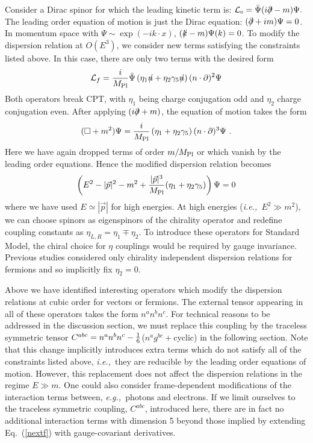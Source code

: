 \documentclass[12pt]{article}
\newcommand{\gam}{\gamma}
\newcommand{\be}{\begin{equation}}
\newcommand{\ee}{\end{equation}}
\newcommand{\ie}{{\it i.e.,}\ }
\newcommand{\eg}{{\it e.g.,}\ }
\newcommand{\cL}{{\mathcal L}}
\newcommand{\ssc}{\scriptscriptstyle}
\newcommand{\LL}[1]{\cL_{\ssc #1}}
\newcommand{\prt}{\partial}
\newcommand{\Psib}{\bar{\Psi}}
\newcommand{\mpl}{M_{\rm {\small Pl}}}
\newcommand{\sla}[1]{\hbox{{$#1$}\llap{$/$}}}
\newcommand{\sixth}{{{\scriptstyle 1}\over{\scriptstyle 6}}}
\begin{document}
 Consider a Dirac spinor for which the
leading kinetic term is: $\LL0 = \Psib(i\sla{\prt}-m)\Psi.$ The
leading order equation of motion is just the Dirac equation:
$(\sla{\prt}+im)\Psi=0$. In momentum space with
$\Psi\sim\exp(-ik\cdot x)$, $(\sla{k}-m)\Psi(k)=0$. To modify the
dispersion relation at $O(E^3)$, we consider new terms satisfying
the constraints listed above. In this case, there are only two
terms with the desired form
%
\be \label{nextf} {\mathcal L}_f={i\over\mpl}\Psib\left(
\eta_1\sla{n}
+\eta_2\gam_5\sla{n}
\right)(n\cdot\prt)^2\Psi \ee
%
Both operators break CPT, with $\eta_1$ being charge conjugation
odd and $\eta_2$ charge conjugation even. After applying
$(i\sla{\prt}+m)$, the equation of motion takes the form
%
\be\label{neweomf2} (\Box+m^2)\Psi= {i\over\mpl}\left(\eta_1
+\eta_2\gam_5\right)(n\cdot\prt)^3\Psi\ .\ee
%
Here we have again dropped terms of order $m/\mpl$ or which vanish
by the leading order equations. Hence the modified dispersion
relation becomes
%
\be \label{newdispf}
\left(E^2-|\vec{p}|^2-m^2+{|\vec{p}|^3\over\mpl}(\eta_1
+\eta_2\gam_5)\right)\Psi =0 \ee
%
where we have used $E\simeq|\vec{p}|$ for high energies. At high
energies (\ie $E^2\gg m^2$), we can choose spinors as eigenspinors
of the chirality operator and redefine coupling constants as
$\eta_{L,R} = \eta_1 \mp \eta_2$. To introduce these operators for
Standard Model, the chiral choice for $\eta$ couplings would be
required by gauge invariance. Previous studies\cite{Jacob,wow}
considered only chirality independent dispersion relations for
fermions and so implicitly fix $\eta_2=0$.

Above we have identified interesting operators which modify the
dispersion relations at cubic order for vectors or fermions. The
external tensor appearing in all of these operators takes the form
$n^an^bn^c$. For technical reasons to be addressed in the
discussion section, we must replace this coupling by the traceless
symmetric tensor $C^{abc}= n^an^bn^c -\sixth$($n^ag^{bc}+$cyclic)
in the following section. Note that this change implicitly
introduces extra terms which do not satisfy all of the constraints
listed above, \ie they are reducible by the leading order
equations of motion. However, this replacement does not affect the
dispersion relations in the regime $E\gg m$. One could also
consider frame-dependent modifications of the interaction terms
between, \eg photons and electrons. If we limit ourselves to the
traceless symmetric coupling, $C^{abc}$, introduced here, there
are in fact no additional interaction terms with dimension 5
beyond those implied by extending Eq.~(\ref{nextf}) with
gauge-covariant derivatives.
\end{document}
